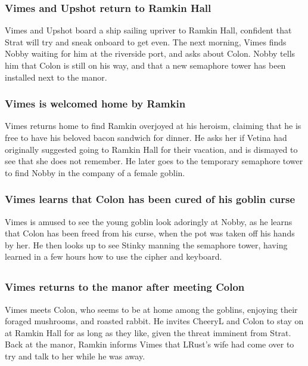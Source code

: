 \subsubsection{\Gls{Vimes} and \Gls{Upshot} return to Ramkin Hall}
\Gls{Vimes} and \Gls{Upshot} board a ship sailing upriver to Ramkin Hall, confident that \Gls{Strat}
will try and sneak onboard to get even. The next morning, \Gls{Vimes} finds \Gls{Nobby} waiting
for him at the riverside port, and asks about \Gls{Colon}. \Gls{Nobby} tells him that \Gls{Colon} is
still on his way, and that a new semaphore tower has been installed next to the manor.

\subsubsection{\Gls{Vimes} is welcomed home by \Gls{Ramkin}}
\Gls{Vimes} returns home to find \Gls{Ramkin} overjoyed at his heroism, claiming that he is free to
have his beloved bacon sandwich for dinner. He asks her if \Gls{Vetina} had originally suggested
going to Ramkin Hall for their vacation, and is dismayed to see that she does not remember. He later
goes to the temporary semaphore tower to find \Gls{Nobby} in the company of a female goblin.

\subsubsection{\Gls{Vimes} learns that \Gls{Colon} has been cured of his goblin curse}
\Gls{Vimes} is amused to see the young goblin look adoringly at \Gls{Nobby}, as he learns that
\Gls{Colon} has been freed from his curse, when the pot was taken off his hands by her. He then
looks up to see \Gls{Stinky} manning the semaphore tower, having learned in a few hours how to use
the cipher and keyboard.

\subsection{}
\subsubsection{\Gls{Vimes} returns to the manor after meeting \Gls{Colon}}
\Gls{Vimes} meets \Gls{Colon}, who seems to be at home among the goblins, enjoying their foraged
mushrooms, and roasted rabbit. He invites \Gls{CheeryL} and \Gls{Colon} to stay on at Ramkin Hall
for as long as they like, given the threat imminent from \Gls{Strat}. Back at the manor,
\Gls{Ramkin} informs \Gls{Vimes} that \Gls{LRust}'s wife had come over to try and talk to her while
he was away.

